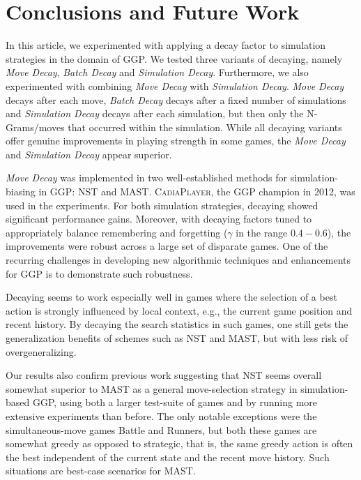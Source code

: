 \documentclass[journal]{IEEEtran}
\begin{document}
\section{Conclusions and Future Work}

\label{sec:conclusions}
In this article, we experimented with applying a decay factor to simulation strategies in the domain of GGP. We tested three variants of decaying, namely \textit{Move Decay}, \textit{Batch Decay} and \textit{Simulation Decay}. Furthermore, we also experimented with combining \textit{Move Decay} with \textit{Simulation Decay}. \textit{Move Decay} decays after each move, \textsl{Batch Decay} decays after a fixed number of simulations and \textit{Simulation Decay} decays after each simulation, but then only the N-Grams/moves that occurred within the simulation. While all decaying variants offer genuine improvements in playing strength in some games, the \textit{Move Decay} and \textit{Simulation Decay} appear superior.    

\textit{Move Decay} was implemented in two well-established methods for simulation-biasing in GGP: NST and MAST. \textsc{CadiaPlayer}, the GGP champion in 2012, was used in the experiments. For both simulation strategies, decaying showed significant performance gains. Moreover, with decaying factors tuned to appropriately balance remembering and forgetting ($\gamma$ in the range $0.4-0.6$), the improvements were robust across a large set of disparate games. One of the recurring challenges in developing new algorithmic techniques and enhancements for GGP is to demonstrate such robustness.

Decaying seems to work especially well in games where the selection of a best action is strongly influenced by local context, e.g., the current game position and recent history.
By decaying the search statistics in such games, one still gets the generalization benefits of schemes such as NST and MAST, but with less risk of overgeneralizing. 


Our results also confirm previous work suggesting that NST seems overall somewhat superior to MAST as a general move-selection strategy in simulation-based GGP, using both a larger test-suite of games and by running more extensive experiments than before.  The only notable exceptions were the simultaneous-move games Battle and Runners, but  both these games are somewhat greedy as opposed to strategic, that is, the same greedy action is often the best independent of the current state and the recent move history. Such situations are best-case scenarios for MAST.
\end{document}
